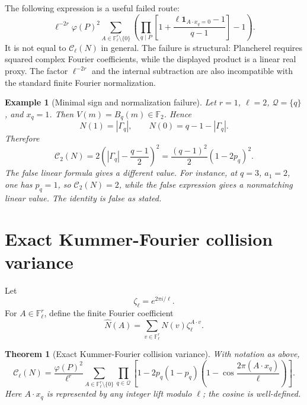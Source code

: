 \documentclass[11pt]{article}
\newtheorem{theorem}{Theorem}
\newtheorem{example}{Example}
\newcommand{\F}{\mathbb F}
\newcommand{\one}{\mathbf 1}
\begin{document}
The following expression is a useful failed route:
\[
\ell^{-2r}\varphi(P)^2
\sum_{A\in\F_\ell^r\setminus\{0\}}
\left(
\prod_{q\mid P}
\left[
1+\frac{\ell\one_{A\cdot x_q=0}-1}{q-1}
\right]
-1
\right).
\]
It is not equal to \(\mathcal C_\ell(N)\) in general.  The failure is structural: Plancherel requires squared complex Fourier coefficients, while the displayed product is a linear real proxy.  The factor \(\ell^{-2r}\) and the internal subtraction are also incompatible with the standard finite Fourier normalization.

\begin{example}[Minimal sign and normalization failure]
Let \(r=1\), \(\ell=2\), \(\mathcal Q=\{q\}\), and \(x_q=1\).  Then \(V(m)=B_q(m)\in\F_2\).  Hence
\[
N(1)=|\Gamma_q|,
\qquad
N(0)=q-1-|\Gamma_q|.
\]
Therefore
\[
\mathcal C_2(N)
=
2\left(|\Gamma_q|-\frac{q-1}{2}\right)^2
=
\frac{(q-1)^2}{2}(1-2p_q)^2.
\]
The false linear formula gives a different value.  For instance, at \(q=3\), \(a_1=2\), one has \(p_q=1\), so \(\mathcal C_2(N)=2\), while the false expression gives a nonmatching linear value.  The identity is false as stated.
\end{example}

\section{Exact Kummer-Fourier collision variance}

Let
\[
\zeta_\ell=e^{2\pi i/\ell}.
\]
For \(A\in\F_\ell^r\), define the finite Fourier coefficient
\[
\widehat N(A)=\sum_{v\in\F_\ell^r}N(v)\zeta_\ell^{A\cdot v}.
\]

\begin{theorem}[Exact Kummer-Fourier collision variance]\label{T:kummer-fourier-collision}
With notation as above,
\[
\mathcal{C}_\ell(N)=
\frac{\varphi(P)^2}{\ell^r}
\sum_{A\in\F_\ell^r\setminus\{0\}}
\prod_{q\in\mathcal Q}
\left[
1-2p_q(1-p_q)
\left(1-\cos\frac{2\pi(A\cdot x_q)}{\ell}\right)
\right].
\]
Here \(A\cdot x_q\) is represented by any integer lift modulo \(\ell\); the cosine is well-defined.
\end{theorem}
\end{document}
